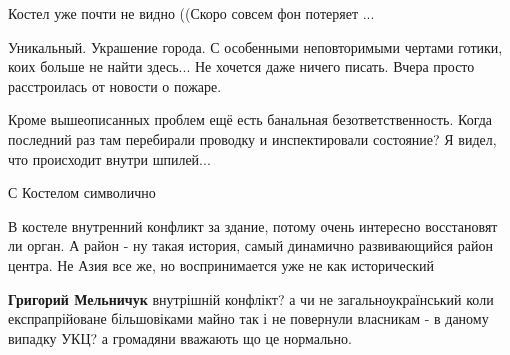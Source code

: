 \begin{itemize}
Костел уже почти не видно ((Скоро совсем фон потеряет ...

 

Уникальный. Украшение города. С особенными неповторимыми чертами готики, коих больше не найти здесь...
Не хочется даже ничего писать. Вчера просто расстроилась от новости о пожаре.

 

Кроме вышеописанных проблем ещё есть банальная безответственность. Когда
последний раз там перебирали проводку и инспектировали состояние? Я видел, что
происходит внутри шпилей...


 
С Костелом символично

 

В костеле внутренний конфликт за здание, потому очень интересно восстановят ли
орган.  А район - ну такая история, самый динамично развивающийся район центра.
Не Азия все же, но воспринимается уже не как исторический

\begin{itemize}
 
\textbf{Григорий Мельничук} внутрішній конфлікт? а чи не загальноукраїнський коли експрапрійоване більшовіками майно так і не повернули власникам - в даному випадку УКЦ? а громадяни вважають що це нормально.


\end{itemize}
\end{itemize}
